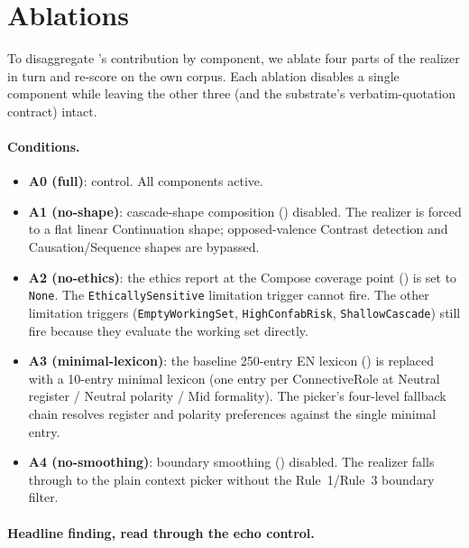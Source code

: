 \section{Ablations}
\label{sec:ablations}

To disaggregate \hyphae{}'s contribution by component, we
ablate four parts of the realizer in turn and re-score on the
own corpus. Each ablation disables a single component while
leaving the other three (and the substrate's verbatim-quotation
contract) intact.

\paragraph{Conditions.}

\begin{itemize}
    \item \textbf{A0 (full)}: control. All components active.
    \item \textbf{A1 (no-shape)}: cascade-shape composition
    () disabled. The realizer is forced to a
    flat linear Continuation shape; opposed-valence Contrast
    detection and Causation/Sequence shapes are bypassed.
    \item \textbf{A2 (no-ethics)}: the ethics report at the
    Compose coverage point () is set to
    \texttt{None}. The \texttt{EthicallySensitive} limitation
    trigger cannot fire. The other limitation triggers
    (\texttt{EmptyWorkingSet}, \texttt{HighConfabRisk},
    \texttt{ShallowCascade}) still fire because they evaluate the
    working set directly.
    \item \textbf{A3 (minimal-lexicon)}: the baseline 250-entry
    EN lexicon () is replaced with a
    10-entry minimal lexicon (one entry per ConnectiveRole at
    Neutral register / Neutral polarity / Mid formality). The
    picker's four-level fallback chain resolves register and
    polarity preferences against the single minimal entry.
    \item \textbf{A4 (no-smoothing)}: boundary smoothing
    () disabled. The realizer falls through
    to the plain context picker without the
    Rule~1/Rule~3 boundary filter.
\end{itemize}

\paragraph{Headline finding, read through the echo control.}

